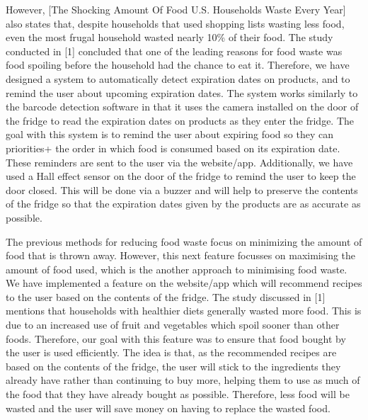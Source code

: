 However, [The Shocking Amount Of Food U.S.
Households Waste Every Year] also states that, despite households that used shopping lists wasting less food, even the most frugal household wasted nearly 10\% of their food.
The study conducted in [1] concluded that one of the leading reasons for food waste was food spoiling before the household had the chance to eat it.
Therefore, we have designed a system to automatically detect expiration dates on products, and to remind the user about upcoming expiration dates.
The system works similarly to the barcode detection software in that it uses the camera installed on the door of the fridge to read the expiration dates on products as they enter the fridge.
The goal with this system is to remind the user about expiring food so they can priorities+ the order in which food is consumed based on its expiration date.
These reminders are sent to the user via the website/app.
Additionally, we have used a Hall effect sensor on the door of the fridge to remind the user to keep the door closed.
This will be done via a buzzer and will help to preserve the contents of the fridge so that the expiration dates given by the products are as accurate as possible.  

The previous methods for reducing food waste focus on minimizing the amount of food that is thrown away.
However, this next feature focusses on maximising the amount of food used, which is the another approach to minimising food waste.
We have implemented a feature on the website/app which will recommend recipes to the user based on the contents of the fridge.
The study discussed in [1] mentions that households with healthier diets generally wasted more food.
This is due to an increased use of fruit and vegetables which spoil sooner than other foods.
Therefore, our goal with this feature was to ensure that food bought by the user is used efficiently.
The idea is that, as the recommended recipes are based on the contents of the fridge, the user will stick to the ingredients they already have rather than continuing to buy more, helping them to use as much of the food that they have already bought as possible.
Therefore, less food will be wasted and the user will save money on having to replace the wasted food.

